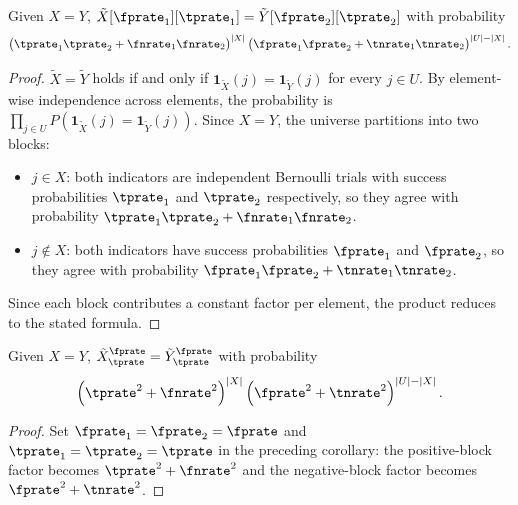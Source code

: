 \begin{corollary}
\label{cor:equality_prob}
Given $X = Y$, $\tilde{X}[\fprate_1][\tprate_1] = \tilde{Y}[\fprate_2][\tprate_2]$ with probability
\begin{equation}
\left(\tprate_1\tprate_2 + \fnrate_1\fnrate_2\right)^{|X|}
\left(\fprate_1\fprate_2 + \tnrate_1\tnrate_2\right)^{|U| - |X|}.
\end{equation}
\end{corollary}
\begin{proof}
$\tilde{X} = \tilde{Y}$ holds if and only if $\mathbf{1}_{\tilde{X}}(j) = \mathbf{1}_{\tilde{Y}}(j)$ for every $j \in U$.
By element-wise independence across elements, the probability is
$\prod_{j \in U} P(\mathbf{1}_{\tilde{X}}(j) = \mathbf{1}_{\tilde{Y}}(j))$.
Since $X = Y$, the universe partitions into two blocks:
\begin{itemize}
	\item $j \in X$: both indicators are independent Bernoulli trials with success probabilities $\tprate_1$ and $\tprate_2$ respectively, so they agree with probability $\tprate_1\tprate_2 + \fnrate_1\fnrate_2$.
	\item $j \notin X$: both indicators have success probabilities $\fprate_1$ and $\fprate_2$, so they agree with probability $\fprate_1\fprate_2 + \tnrate_1\tnrate_2$.
\end{itemize}
Since each block contributes a constant factor per element, the product reduces to the stated formula.
\end{proof}


\begin{corollary}
	Given $X = Y$, $\tilde{X}^\fprate_\tprate = \tilde{Y}^\fprate_\tprate$ with probability
	\begin{equation}
	\left(\tprate^2 + \fnrate^2\right)^{|X|}
	\left(\fprate^2 + \tnrate^2\right)^{|U| - |X|}.
	\end{equation}
\end{corollary}
\begin{proof}
Set $\fprate_1 = \fprate_2 = \fprate$ and $\tprate_1 = \tprate_2 = \tprate$
in the preceding corollary: the positive-block factor becomes
$\tprate^2 + \fnrate^2$ and the negative-block factor becomes
$\fprate^2 + \tnrate^2$.
\end{proof}


